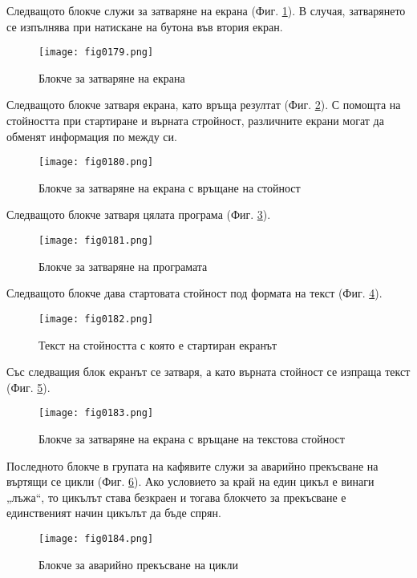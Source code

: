 Следващото блокче служи за затваряне на екрана (Фиг. \ref{fig0179}). В случая, затварянето се изпълнява при натискане на бутона във втория екран. 

\begin{figure}[H]
  \centering
  \texttt{[image: fig0179.png]}
  \caption{Блокче за затваряне на екрана}
\label{fig0179}
\end{figure}

Следващото блокче затваря екрана, като връща резултат (Фиг. \ref{fig0180}). С помощта на стойността при стартиране и върната стройност, различните екрани могат да обменят информация по между си. 

\begin{figure}[H]
  \centering
  \texttt{[image: fig0180.png]}
  \caption{Блокче за затваряне на екрана с връщане на стойност}
\label{fig0180}
\end{figure}

Следващото блокче затваря цялата програма (Фиг. \ref{fig0181}).

\begin{figure}[H]
  \centering
  \texttt{[image: fig0181.png]}
  \caption{Блокче за затваряне на програмата}
\label{fig0181}
\end{figure}

Следващото блокче дава стартовата стойност под формата на текст (Фиг. \ref{fig0182}).

\begin{figure}[H]
  \centering
  \texttt{[image: fig0182.png]}
  \caption{Текст на стойността с която е стартиран екранът}
\label{fig0182}
\end{figure}

Със следващия блок екранът се затваря, а като върната стойност се изпраща текст (Фиг. \ref{fig0183}).

\begin{figure}[H]
  \centering
  \texttt{[image: fig0183.png]}
  \caption{Блокче за затваряне на екрана с връщане на текстова стойност}
\label{fig0183}
\end{figure}

Последното блокче в групата на кафявите служи за аварийно прекъсване на въртящи се цикли (Фиг. \ref{fig0184}). Ако условието за край на един цикъл е винаги „лъжа“, то цикълът става безкраен и тогава блокчето за прекъсване е единственият начин цикълът да бъде спрян.

\begin{figure}[H]
  \centering
  \texttt{[image: fig0184.png]}
  \caption{Блокче за аварийно прекъсване на цикли}
\label{fig0184}
\end{figure}

